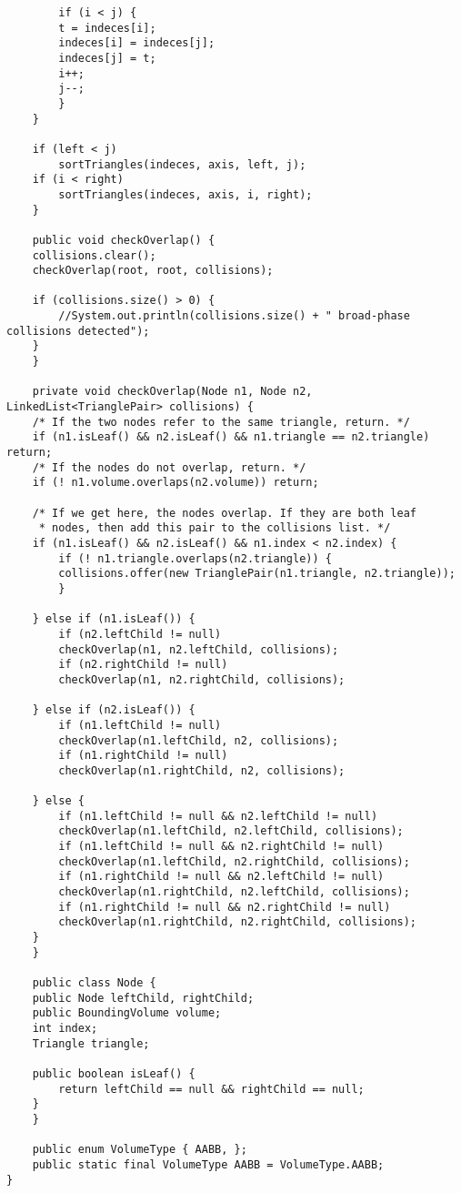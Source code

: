 \begin{lstlisting}
	    if (i < j) {
		t = indeces[i];
		indeces[i] = indeces[j];
		indeces[j] = t;
		i++;
		j--;
	    }
	}

	if (left < j)
	    sortTriangles(indeces, axis, left, j);
	if (i < right)
	    sortTriangles(indeces, axis, i, right);
    }

    public void checkOverlap() {
	collisions.clear();
	checkOverlap(root, root, collisions);

	if (collisions.size() > 0) {
	    //System.out.println(collisions.size() + " broad-phase collisions detected");
	}
    }

    private void checkOverlap(Node n1, Node n2, LinkedList<TrianglePair> collisions) {
	/* If the two nodes refer to the same triangle, return. */
	if (n1.isLeaf() && n2.isLeaf() && n1.triangle == n2.triangle) return;
	/* If the nodes do not overlap, return. */
	if (! n1.volume.overlaps(n2.volume)) return;

	/* If we get here, the nodes overlap. If they are both leaf
	 * nodes, then add this pair to the collisions list. */
	if (n1.isLeaf() && n2.isLeaf() && n1.index < n2.index) {
	    if (! n1.triangle.overlaps(n2.triangle)) {
		collisions.offer(new TrianglePair(n1.triangle, n2.triangle));
	    }

	} else if (n1.isLeaf()) {
	    if (n2.leftChild != null)
		checkOverlap(n1, n2.leftChild, collisions);
	    if (n2.rightChild != null)
		checkOverlap(n1, n2.rightChild, collisions);

	} else if (n2.isLeaf()) {
	    if (n1.leftChild != null)
		checkOverlap(n1.leftChild, n2, collisions);
	    if (n1.rightChild != null)
		checkOverlap(n1.rightChild, n2, collisions);

	} else {
	    if (n1.leftChild != null && n2.leftChild != null)
		checkOverlap(n1.leftChild, n2.leftChild, collisions);
	    if (n1.leftChild != null && n2.rightChild != null)
		checkOverlap(n1.leftChild, n2.rightChild, collisions);
	    if (n1.rightChild != null && n2.leftChild != null)
		checkOverlap(n1.rightChild, n2.leftChild, collisions);
	    if (n1.rightChild != null && n2.rightChild != null)
		checkOverlap(n1.rightChild, n2.rightChild, collisions);
	}
    }

    public class Node {
	public Node leftChild, rightChild;
	public BoundingVolume volume;
	int index;
	Triangle triangle;

	public boolean isLeaf() {
	    return leftChild == null && rightChild == null;
	}
    }

    public enum VolumeType { AABB, };
    public static final VolumeType AABB = VolumeType.AABB;
}\end{lstlisting}

